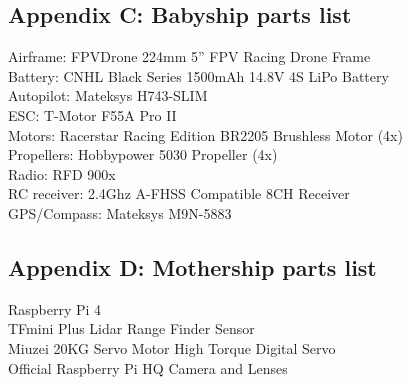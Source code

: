 \documentclass[11pt]{article}
\begin{document}
\subsection*{Appendix C: Babyship parts list}
Airframe: FPVDrone 224mm 5” FPV Racing Drone Frame\\
Battery: CNHL Black Series 1500mAh 14.8V 4S LiPo Battery\\
Autopilot: Mateksys H743-SLIM\\
ESC: T-Motor F55A Pro II\\
Motors: Racerstar Racing Edition BR2205 Brushless Motor (4x)\\
Propellers: Hobbypower 5030 Propeller (4x)\\
Radio: RFD 900x\\
RC receiver: 2.4Ghz A-FHSS Compatible 8CH Receiver\\
GPS/Compass: Mateksys M9N-5883

\subsection*{Appendix D: Mothership parts list}
Raspberry Pi 4\\
TFmini Plus Lidar Range Finder Sensor\\
Miuzei 20KG Servo Motor High Torque Digital Servo\\
Official Raspberry Pi HQ Camera and Lenses
\end{document}
